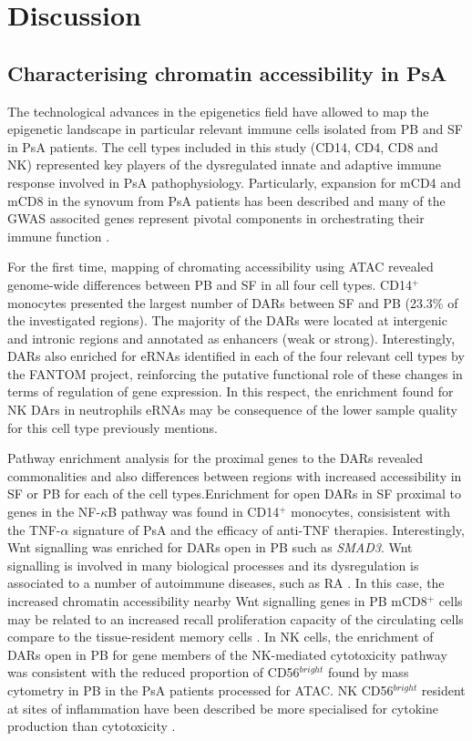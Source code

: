  

\section{Discussion}

\subsection{Characterising chromatin accessibility in PsA}
The technological advances in the epigenetics field have allowed to map the epigenetic landscape in particular relevant immune cells isolated from PB and SF in PsA patients. The cell types included in this study (CD14, CD4, CD8 and NK) represented key players of the dysregulated innate and adaptive immune response involved in PsA pathophysiology. Particularly, expansion for mCD4 and mCD8 in the synovum from PsA patients has been described and many of the GWAS associted genes represent pivotal components in orchestrating their immune function \parencite{Taams2018}.

For the first time, mapping of chromating accessibility using ATAC revealed genome-wide differences between PB and SF in all four cell types. CD14$^+$ monocytes presented the largest number of DARs between SF and PB (23.3\% of the investigated regions). The majority of the DARs were located at intergenic and intronic regions and annotated as enhancers (weak or strong). Interestingly, DARs also enriched for eRNAs identified in each of the four relevant cell types by the FANTOM project, reinforcing the putative functional role of these changes in terms of regulation of gene expression. In this respect, the enrichment found for NK DArs in neutrophils eRNAs may be consequence of the lower sample quality for this cell type previously mentions.

Pathway enrichment analysis for the proximal genes to the DARs revealed commonalities and also differences between regions with increased accessibility in SF or PB for each of the cell types.Enrichment for open DARs in SF proximal to genes in the NF-$\kappa$B pathway was found in CD14$^+$ monocytes, consisistent with the TNF-$\alpha$ signature of PsA and the efficacy of anti-TNF therapies. Interestingly, Wnt signalling was enriched for DARs open in PB such as \textit{SMAD3}. Wnt signalling is involved in many biological processes and its dysregulation is associated to a number of autoimmune diseases, such as RA \parencite{Miao2013}. In this case, the increased chromatin accessibility nearby Wnt signalling genes in PB mCD8$^+$ cells may be related to an increased recall proliferation capacity of the circulating cells compare to the tissue-resident memory cells \parencite{Boudousquie2014}. In NK cells, the enrichment of DARs open in PB for gene members of the NK-mediated cytotoxicity pathway was consistent with the reduced proportion of CD56$^{bright}$ found by mass cytometry in PB in the PsA patients processed for ATAC. NK CD56$^{bright}$ resident at sites of inflammation have been described be more specialised for cytokine production than cytotoxicity \parencite{Michel2016}.

